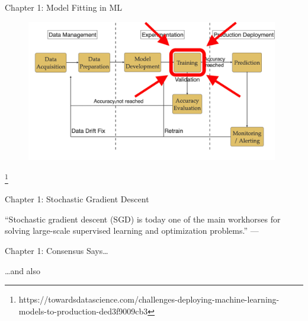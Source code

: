 \documentclass[mathserif,notheorems, hyperref={colorlinks, citecolor=blue, urlcolor=blue, linkcolor=blue}]{beamer}
\newcommand{\source}[1]{{\let\thefootnote\relax\footnote{{\tiny #1}}}}
\def\\{}%
\begin{document}
    \begin{frame}{Chapter 1: Model Fitting in ML}
       
       \begin{figure}
            \centering
            \includegraphics[width=0.98\textwidth]{figures/workflow_highlighted} 
       \end{figure} 

       \source{https://towardsdatascience.com/challenges-deploying-machine-learning-models-to-production-ded3f9009cb3}
    \end{frame}
    
    \begin{frame}{Chapter 1: Stochastic Gradient Descent}

        \begin{center}
            \Large
            ``Stochastic gradient descent (SGD) is today one of the main workhorses for solving large-scale supervised learning and optimization problems.''\\
            ---\citet{drori2019complexity}
        \end{center}

    \end{frame}

    \begin{frame}{Chapter 1: Consensus Says\ldots}

        \begin{center}
            \Large \dots and also~\citet{xu2017second,
            zhang2016parallel,
            patterson2017deep,
            pillaud2018statistical,
            grosse2015scaling,
            assran2018stochastic,
            damaskinos2019aggregathor,
            kawaguchi2020ordered,
            bernstein2018signsgd,
            li2019rsa,
            agarwal2017second,
            hofmann2015variance,
            geffner2019rule,
            assran2020convergence,
            gower2019sgd}
        \end{center}

    \end{frame}
\end{document}
